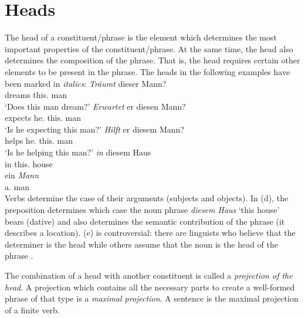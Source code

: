 \section{Heads}
\label{Abschnitt-Kopf}

The head of a constituent/phrase is the element which determines the most important
properties of the constituent/phrase. At the same time, the head also determines the composition of the
phrase. That is, the head requires certain other elements to be present in the phrase. The heads in the following
examples have been marked in \emph{italics}:
\eal
\ex 
\gll \emph{Träumt} dieser Mann?\\
     dreams this.\nom{} man\\
\glt `Does this man dream?'
\ex 
\gll \emph{Erwartet} er diesen Mann?\\
	 expects he.\nom{} this.\acc{} man\\
\glt `Is he expecting this man?'
\ex 
\gll \emph{Hilft} er diesem Mann?\\
	 helps he.\nom{} this.\dat{} man\\
\glt `Is he helping this man?'
\ex 
\gll \emph{in} diesem Haus\\
	 in this.\dat{} house\\
\ex 
\gll ein \emph{Mann}\\
	 a.\nom{} man\\
\zl
Verbs determine the case of their arguments (subjects and objects). In (d), the preposition determines which case the noun phrase \emph{diesem Haus} `this house'
bears (dative) and also determines the semantic contribution of the phrase (it describes a location). (e) is controversial: there are linguists who believe that the
determiner is the head
\parencites[]{Ajdukiewicz35a-u}{VH77a-u,Brame82a}[--92]{Hudson84a-u}{Hellan86a,Abney87a,Netter94,Netter98a}
while others assume that the noun is the head of the phrase \parencites{vanLangendonck94a}[]{ps2}{Demske2001a}[Section~6.6.1]{MuellerLehrbuch1}{Hudson2004a}{Bruening2009a}.


The combination of a head with another constituent is called a \emph{projection
of the head}. A projection which contains all the necessary parts to create a well-formed phrase of that type
is a \emph{maximal projection}. A sentence is the maximal projection of a finite verb.

